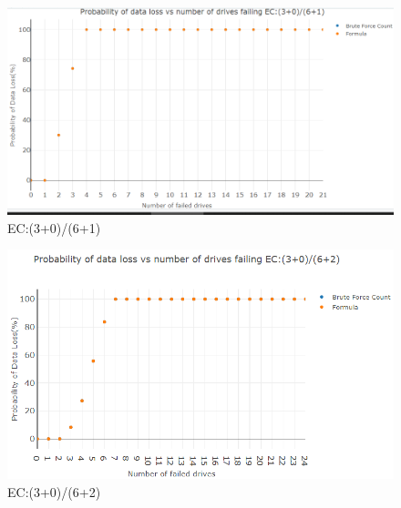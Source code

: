 \documentclass[journal]{IEEEtran}
\begin{document}
\begin{figure}[H]

{\centering \includegraphics[width=0.65\linewidth]{3061} 

}

\caption{EC:(3+0)/(6+1)}\label{fig:3061}
\end{figure}

\begin{figure}[H]

{\centering \includegraphics[width=0.65\linewidth]{3062} 

}

\caption{EC:(3+0)/(6+2)}\label{fig:3062}
\end{figure}

\newpage
\singlespacing 
\end{document}
